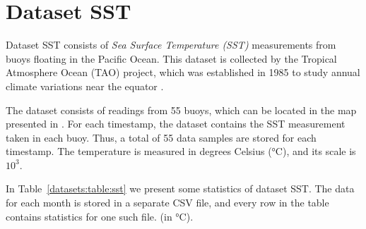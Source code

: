 
\newcommand{\TAODef}{This dataset is collected by the Tropical Atmosphere Ocean (TAO) project, which was established in 1985 to study annual climate variations near the equator \cite{dataset:tao}.}


\vspace{-25pt}
\section{Dataset SST}
\label{datasets:sst}


\vspace{-5pt}
Dataset SST \cite{dataset:sst1} consists of \textit{Sea Surface Temperature (SST)} measurements from buoys floating in the Pacific Ocean. \TAODef


The dataset consists of readings from 55 buoys, which can be located in the map presented in \cite{dataset:sst1}. For each timestamp, the dataset contains the SST measurement taken in each buoy. Thus, a total of 55 data samples are stored for each timestamp. The temperature is measured in degrees Celsius (°C), and its scale is $10^3$.


In Table~\ref{datasets:table:sst} we present some statistics of dataset SST. The data for each month is stored in a separate CSV file, and every row in the table contains statistics for one such file. \commonTable (in °C).




